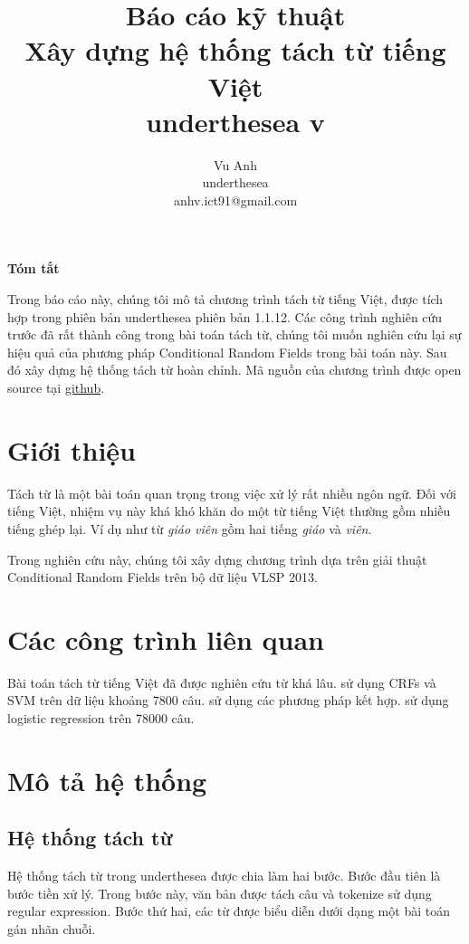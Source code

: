 \documentclass[11pt,a4paper]{article}
\title{Báo cáo kỹ thuật\\ Xây dựng hệ thống tách từ tiếng Việt \\ underthesea v\version}
\author{
Vu Anh\\
underthesea\\
anhv.ict91@gmail.com
}
\date{}
\newcommand\version{1.1.12}
\renewenvironment{abstract}%
{\centerline{\large\bf Tóm tắt}%
\begin{list}{}%
{\setlength{\rightmargin}{0.6cm}%
\setlength{\leftmargin}{0.6cm}}%
\item[]\ignorespaces}%
{\unskip\end{list}}
\begin{document}
\maketitle
\begin{abstract}

Trong báo cáo này, chúng tôi mô tả chương trình tách từ tiếng Việt, được tích hợp trong phiên bản underthesea phiên bản \version.
Các công trình nghiên cứu trước đã rất thành công trong bài toán tách từ, chúng tôi muốn nghiên cứu lại sự hiệu quả của phương pháp Conditional Random Fields trong bài toán này. Sau đó xây dựng hệ thống tách từ hoàn chỉnh.
Mã nguồn của chương trình được open source tại \href{https://github.com/undertheseanlp/word_tokenize}{github}.

\end{abstract}

\section{Giới thiệu}

Tách từ là một bài toán quan trọng trong việc xử lý rất nhiều ngôn ngữ. Đối với tiếng Việt, nhiệm vụ này khá khó khăn do một từ tiếng Việt thường gồm nhiều tiếng ghép lại. Ví dụ như từ \textit{giáo viên} gồm hai tiếng \textit{giáo} và \textit{viên}.

Trong nghiên cứu này, chúng tôi xây dựng chương trình dựa trên giải thuật Conditional Random Fields trên bộ dữ liệu VLSP 2013.

\section{Các công trình liên quan}

Bài toán tách từ tiếng Việt đã được nghiên cứu từ khá lâu. \citet{Nguyen2006VietnameseWS} sử dụng CRFs và SVM trên dữ liệu khoảng 7800 câu. \citet{huyen2008hybrid} sử dụng các phương pháp kết hợp. \citet{7800279} sử dụng logistic regression trên 78000 câu.

\section{Mô tả hệ thống}

\subsection{Hệ thống tách từ}

Hệ thống tách từ trong underthesea được chia làm hai bước. Bước đầu tiên là bước tiền xử lý. Trong bước này, văn bản được tách câu và tokenize sử dụng regular expression. Bước thứ hai, các từ được biểu diễn dưới dạng một bài toán gán nhãn chuỗi.
\end{document}
